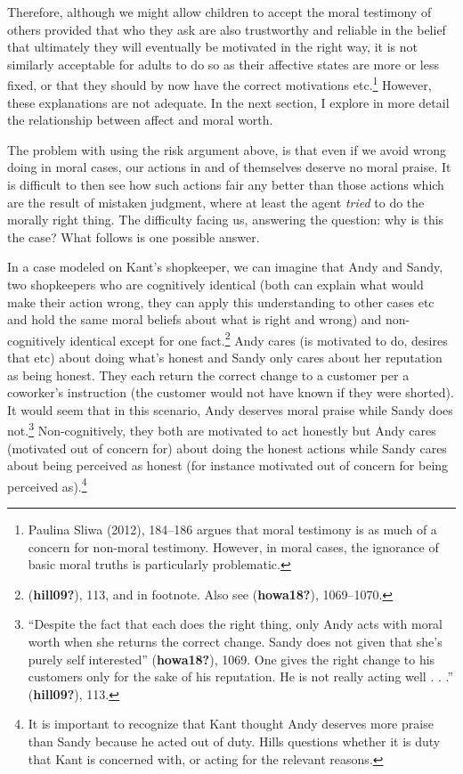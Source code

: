 \documentclass[12pt]{book}
\theoremstyle{definition}
\theoremstyle{remark}
\begin{document}
Therefore, although we might allow children to accept the moral testimony of others provided that who they ask are also trustworthy and reliable in the belief that ultimately they will eventually be motivated in the right way, it is not similarly acceptable for adults to do so as their affective states are more or less fixed, or that they should by now have the correct motivations etc.\footnote{Paulina Sliwa (2012), 184--186 argues that moral testimony is as much of a concern for non-moral testimony. However, in moral cases, the ignorance of basic moral truths is particularly problematic.} However, these explanations are not adequate. In the next section, I explore in more detail the relationship between affect and moral worth.

The problem with using the risk argument above, is that even if we avoid wrong doing in moral cases, our actions in and of themselves deserve no moral praise. It is difficult to then see how such actions fair any better than those actions which are the result of mistaken judgment, where at least the agent \emph{tried} to do the morally right thing. The difficulty facing us, answering the question: why is this the case? What follows is one possible answer.

In a case modeled on Kant's shopkeeper, we can imagine that Andy and Sandy, two shopkeepers who are cognitively identical (both can explain what would make their action wrong, they can apply this understanding to other cases etc and hold the same moral beliefs about what is right and wrong) and non-cognitively identical except for one fact.\footnote{(\textbf{hill09?}), 113, and in footnote. Also see (\textbf{howa18?}), 1069--1070.} Andy cares (is motivated to do, desires that etc) about doing what's honest and Sandy only cares about her reputation as being honest. They each return the correct change to a customer per a coworker's instruction (the customer would not have known if they were shorted). It would seem that in this scenario, Andy deserves moral praise while Sandy does not.\footnote{``Despite the fact that each does the right thing, only Andy acts with moral worth when she returns the correct change. Sandy does not given that she's purely self interested'' (\textbf{howa18?}), 1069. One gives the right change to his customers only for the sake of his reputation. He is not really acting well . . .'' (\textbf{hill09?}), 113.} Non-cognitively, they both are motivated to act honestly but Andy cares (motivated out of concern for) about doing the honest actions while Sandy cares about being perceived as honest (for instance motivated out of concern for being perceived as).\footnote{It is important to recognize that Kant thought Andy deserves more praise than Sandy because he acted out of duty. Hills questions whether it is duty that Kant is concerned with, or acting for the relevant reasons.}
\end{document}
